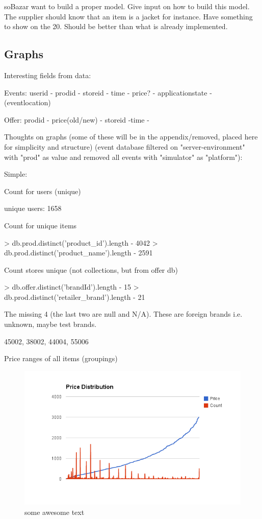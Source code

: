 soBazar want to build a proper model.
Give input on how to build this model. The supplier should know that an item is a jacket for instance.
Have something to show on the 20. Should be better than what is already implemented.



\subsection{Graphs}

Interesting fields from data:

    Events: userid - prodid - storeid - time - price? - applicationstate - (eventlocation)

    Offer: prodid - price(old/new) - storeid -time -

Thoughts on graphs (some of these will be in the appendix/removed, placed here for simplicity and structure) (event database filtered on "server-environment" with "prod" as value and removed all events with "simulator" as "platform"):



    Simple:

        Count for users (unique)

        unique users: 1658


        Count for unique items

        > db.prod.distinct('product\_id').length - 4042
        > db.prod.distinct('product\_name').length - 2591



        Count stores unique (not collections, but from offer db)

        > db.offer.distinct('brandId').length - 15
        > db.prod.distinct('retailer\_brand').length - 21

        The missing 4 (the last two are null and N/A). These are foreign brands i.e. unknown, maybe test brands.

        45002,
        38002,
        44004,
        55006


        Price ranges of all items (groupings)

\begin{figure}[H]
    \includegraphics[width=5in]{image/price_distr.png}
    \centering
    \caption[Price distribution of items]{some awesome text}
    \label{figure:ratingdistr}
\end{figure}

